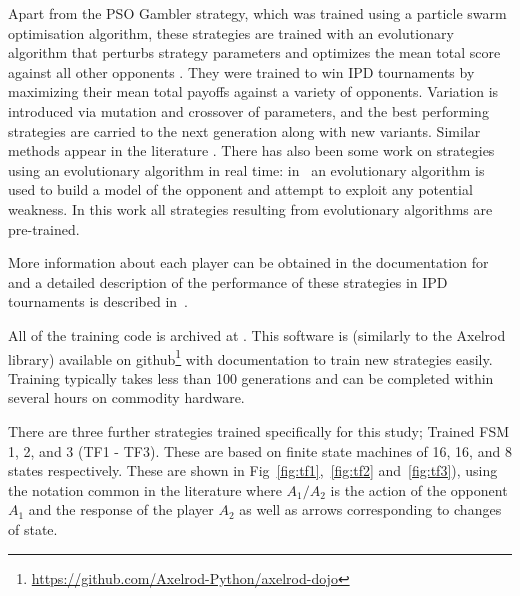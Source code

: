 \documentclass[10pt,letterpaper]{article}
\begin{document}
Apart from the PSO Gambler strategy, which was trained using a particle swarm
optimisation algorithm, these strategies are trained with an evolutionary
algorithm that perturbs strategy parameters and optimizes the mean total score
against all other opponents \cite{affenzeller2009genetic}. They were trained to
win IPD tournaments by maximizing their mean total payoffs against a variety
of opponents. Variation is
introduced via mutation and crossover of parameters, and the best performing
strategies are carried to the next generation along with new variants. Similar
methods appear in the literature \cite{Ashlock2006}.
There has also been some work on strategies using an evolutionary algorithm in real time:
in~\cite{Gaudesi2016}
an evolutionary algorithm is used to build a model of the opponent and attempt
to exploit any potential weakness. In this work all strategies resulting from
evolutionary algorithms are pre-trained.

More information about each player can be obtained in the documentation for
\cite{axelrodproject} and a detailed description of the performance
of these strategies in IPD tournaments is described in~\cite{Harper2017}.

All of the training code is archived at \cite{marc_harper_2017_824264}. This
software is (similarly to the Axelrod library) available on
github\footnote{\url{https://github.com/Axelrod-Python/axelrod-dojo}}
with documentation to
train new strategies easily. Training
typically takes less than 100 generations and can be completed within several
hours on commodity hardware.

There are three further strategies trained specifically for this study; Trained
FSM 1, 2, and 3 (TF1 - TF3). These are based on finite state machines of 16, 16,
and 8 states respectively. These are shown in Fig~\ref{fig:tf1},~\ref{fig:tf2}
and~\ref{fig:tf3}), using the notation common in the literature where
\(A_1/A_2\) is the action of the opponent \(A_1\) and the response of the player
\(A_2\) as well as arrows corresponding to changes of state.
\end{document}
